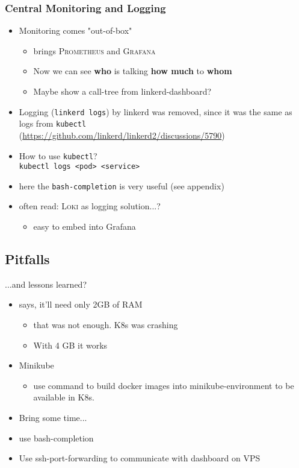 \subsubsection{Central Monitoring and Logging}
\begin{itemize}
	\item Monitoring comes "out-of-box"
	\begin{itemize}
		\item \linkerd{} brings \textsc{Prometheus} and \textsc{Grafana}
		\item  Now we can see \textbf{who} is talking \textbf{how much} to \textbf{whom}
		\item Maybe show a call-tree from linkerd-dashboard?
	\end{itemize}

	\item Logging (\lstinline|linkerd logs|) by linkerd was removed, since it was the same as logs from \lstinline|kubectl|\\
	(\url{https://github.com/linkerd/linkerd2/discussions/5790})
	\item How to use \lstinline|kubectl|?\\
		\lstinline|kubectl logs <pod> <service>|
	\item here the \lstinline|bash-completion| is very useful (see appendix)
	\item often read: \textsc{Loki} as logging solution...?
	\begin{itemize}
		\item easy to embed into  Grafana
	\end{itemize}
\end{itemize}


\subsection{Pitfalls}
...and lessons learned?
\begin{itemize}
	\item \linkerd{} says, it'll need only 2GB of RAM 
	\begin{itemize}
		\item that was not enough. K8s was crashing
		\item With 4 GB it works
	\end{itemize}

	\item Minikube
	\begin{itemize}
		\item use command to build docker images into minikube-environment to be available in K8s.
	\end{itemize}

	\item Bring some time...
	\item use bash-completion
	\item Use ssh-port-forwarding to communicate with dashboard on VPS	
\end{itemize}

